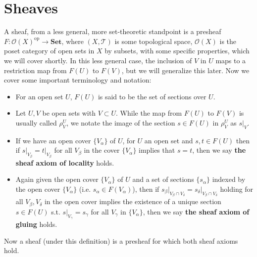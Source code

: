 \documentclass{article}
\newcommand{\catt}[1]{\textbf{#1}}
\begin{document}
\section{Sheaves} \label{sheaves}
A sheaf, from a less general, more set-theoretic standpoint is a presheaf $F:\mathcal{O}(X)^\text{op} \to \catt{Set}$, where $(X, \mathcal{T})$ is some topological space, $\mathcal{O}(X)$ is the poset category of open sets in $X$ by subsets, with some specific properties, which we will cover shortly. In this less general case, the inclusion of $V$ in $U$ maps to a restriction map from $F(U)$ to $F(V)$, but we will generalize this later. Now we cover some important terminology and notation:
\begin{itemize}
	\item For an open set $U$, $F(U)$ is said to be the set of sections over $U$.
	\item Let $U, V$ be open sets with $V \subset U$. While the map from $F(U)$ to $F(V)$ is usually called $\rho^U_V$, we notate the image of the section $s \in F(U)$ in $\rho^U_V$ as $s\vert_V$. 
	\item If we have an open cover $\{V_\alpha\}$ of $U$, for $U$ an open set and $s, t \in F(U)$ then if $s\vert_{V_\beta} = t\vert_{V_\beta}$ for all $V_\beta$ in the cover $\{V_\alpha\}$ implies that $s = t$, then we say \textbf{the sheaf axiom of locality} holds.
	\item Again given the open cover $\{V_\alpha\}$ of $U$ and a set of sections $\{s_\alpha\}$ indexed by the open cover $\{V_\alpha\}$ (i.e. $s_\alpha \in F(V_\alpha)$), then if $s_\beta\vert_{V_\beta \cap V_\delta} = s_\delta\vert_{V_\beta \cap V_\delta}$ holding for all $V_\beta, V_\delta$ in the open cover implies the existence of a unique section $s \in F(U)$ s.t. $s\vert_{V_\gamma} = s_\gamma$ for all $V_\gamma$ in $\{V_\alpha\}$, then we say \textbf{the sheaf axiom of gluing} holds. 
\end{itemize}
Now a sheaf (under this definition) is a presheaf for which both sheaf axioms hold.
\end{document}
